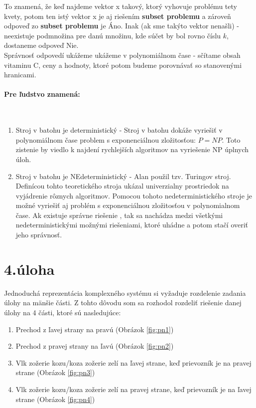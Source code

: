\documentclass[11pt,a4paper]{article}
\begin{document}
To znamená, že keď najdeme vektor x takový, ktorý vyhovuje problému tety kvety, potom ten istý vektor x je aj riešením \textbf{subset problemu} a zároveň odpoveď zo \textbf{subset problemu} je Áno. Inak (ak sme takýto vektor nenašli) - neexistuje podmnožina pre danú množinu, kde súčet by bol rovno číslu $k$, dostaneme odpoveď Nie. \\

Správnosť odpovedí ukážeme ukážeme v polynomiálnom čase - sčítame obsah vitaminu C, ceny a hodnoty, ktoré potom budeme porovnávať so stanovenými hranicami.


\paragraph{Pre ľudstvo znamená:}\mbox{{}}\\
\begin{enumerate}
    \item Stroj v batohu je deterministický - Stroj v batohu dokáže vyriešiť v polynomiálnom čase problem s exponenciálnou zložitosťou: $ P = NP $. Toto zistenie by viedlo k najdení rychlejších algoritmov na vyriešenie NP úplnych úloh. \\
    \item Stroj v batohu je NEdeterministický - Alan použil tzv. Turingov stroj. Definícou tohto teoretického stroja ukázal univerzialny prostriedok na vyjádrenie rôznych algoritmov. Pomocou tohoto  nedeterministického stroje je možné vyriešiť aj problém s exponenciálnou zložitosťou v polynomialnom čase. Ak existuje správne riešenie , tak sa nachádza medzi všetkými nedeterministickými možnými riešeniami, ktoré uhádne a potom stačí overiť jeho správnosť.
\end{enumerate}


\newpage
\section{4.úloha}

Jednoduchá reprezentácia komplexného systému si vyžaduje rozdelenie zadania úlohy na mänšie části. Z tohto dôvodu som sa rozhodol rozdeliť riešenie danej úlohy na 4 části, ktoré sú nasledujúce:
\begin{enumerate}
    \item Prechod z ľavej strany na pravú (Obrázok \ref{fig:pn1})
    \item Prechod z pravej strany na ľavú (Obrázok \ref{fig:pn2})
    \item Vlk zožerie kozu/koza zožerie zelí na ľavej strane, keď prievozník je na pravej strane (Obrázok \ref{fig:pn3})
    \item Vlk zožerie kozu/koza zožerie zelí na pravej strane, keď prievozník je na ľavej strane (Obrázok \ref{fig:pn4})
\end{enumerate}
\end{document}
